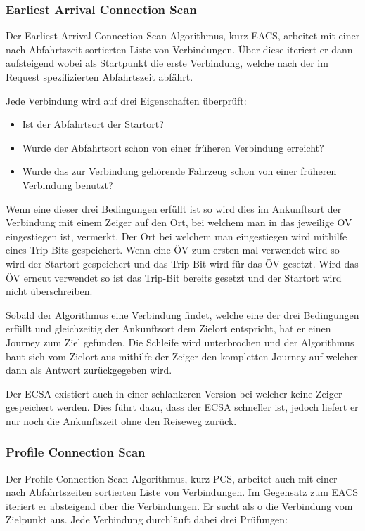 \subsubsection{Earliest Arrival Connection Scan}
Der Earliest Arrival Connection Scan Algorithmus, kurz EACS, arbeitet mit einer nach Abfahrtszeit sortierten Liste von Verbindungen. Über diese iteriert er dann aufsteigend wobei als Startpunkt die erste Verbindung, welche nach der im Request spezifizierten Abfahrtszeit abfährt. 

Jede Verbindung wird auf drei Eigenschaften überprüft:
\begin{itemize}
	\item Ist der Abfahrtsort der Startort?
	\item Wurde der Abfahrtsort schon von einer früheren Verbindung erreicht?
	\item Wurde das zur Verbindung gehörende Fahrzeug schon von einer früheren Verbindung benutzt?
\end{itemize}
Wenn eine dieser drei Bedingungen erfüllt ist so wird dies im Ankunftsort der Verbindung mit einem Zeiger auf den Ort, bei welchem man in das jeweilige ÖV eingestiegen ist, vermerkt. Der Ort bei welchem man eingestiegen wird mithilfe eines Trip-Bits gespeichert. Wenn eine ÖV zum ersten mal verwendet wird so wird der Startort gespeichert und das Trip-Bit wird für das ÖV gesetzt. Wird das ÖV erneut verwendet so ist das Trip-Bit bereits gesetzt und der Startort wird nicht überschreiben. 

Sobald der Algorithmus eine Verbindung findet, welche eine der drei Bedingungen erfüllt und gleichzeitig der Ankunftsort dem Zielort entspricht, hat er einen Journey zum Ziel gefunden. Die Schleife wird unterbrochen und der Algorithmus baut sich vom Zielort aus mithilfe der Zeiger den kompletten Journey auf welcher dann als Antwort zurückgegeben wird.

Der ECSA existiert auch in einer schlankeren Version bei welcher keine Zeiger gespeichert werden. Dies führt dazu, dass der ECSA schneller ist, jedoch liefert er nur noch die Ankunftszeit ohne den Reiseweg zurück.

\subsubsection{Profile Connection Scan}
Der Profile Connection Scan Algorithmus, kurz PCS, arbeitet auch mit einer nach Abfahrtszeiten sortierten Liste von Verbindungen. Im Gegensatz zum EACS iteriert er absteigend über die Verbindungen. Er sucht als o die Verbindung vom Zielpunkt aus. Jede Verbindung durchläuft dabei drei Prüfungen:

